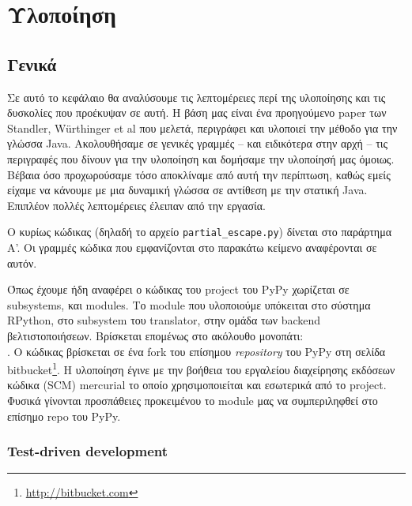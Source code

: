 
\chapter{Υλοποίηση}
\label{chapter4}

\section{Γενικά}

Σε αυτό το κεφάλαιο θα αναλύσουμε τις λεπτομέρειες περί της υλοποίησης και τις
δυσκολίες που προέκυψαν σε αυτή. Η βάση μας είναι ένα προηγούμενο paper των
Standler, W{\"u}rthinger et al\cite{stadler2014partial} που μελετά, περιγράφει
και υλοποιεί την μέθοδο για την γλώσσα Java. Ακολουθήσαμε σε γενικές γραμμές –
και ειδικότερα στην αρχή – τις περιγραφές που δίνουν για την υλοποίηση και
δομήσαμε την υλοποίησή μας όμοιως. Βέβαια όσο προχωρούσαμε τόσο αποκλίναμε από
αυτή την περίπτωση, καθώς εμείς είχαμε να κάνουμε με μια δυναμική γλώσσα σε
αντίθεση με την στατική Java. Επιπλέον πολλές λεπτομέρειες έλειπαν από την
εργασία.

Ο κυρίως κώδικας (δηλαδή το αρχείο \texttt{partial\_escape.py}) δίνεται στο
παράρτημα Α'. Οι γραμμές κώδικα που εμφανίζονται στο παρακάτω κείμενο
αναφέρονται σε αυτόν.

Όπως έχουμε ήδη αναφέρει ο κώδικας του project του PyPy χωρίζεται σε
subsystems, και modules. Το module που υλοποιούμε υπόκειται στο σύστημα
RPython, στο subsystem του translator, στην ομάδα των backend
βελτιστοποιήσεων. Βρίσκεται επομένως στο ακόλουθο μονοπάτι:
\\ . Ο κώδικας
βρίσκεται σε ένα fork\cite{fork} του επίσημου \textit{repository} του
PyPy\cite{repo} στη σελίδα bitbucket\footnote{\url{http://bitbucket.com}}. Η
υλοποίηση έγινε με την βοήθεια του εργαλείου διαχείρησης εκδόσεων κώδικα (SCM)
mercurial\cite{mercurial} το οποίο χρησιμοποιείται και εσωτερικά από το
project. Φυσικά γίνονται προσπάθειες προκειμένου το module μας να
συμπεριληφθεί στο επίσημο repo του PyPy.


\subsection*{Test-driven development}

